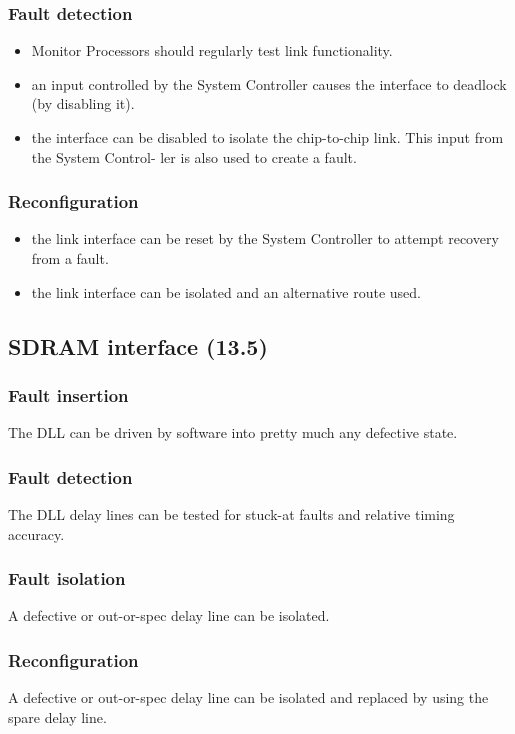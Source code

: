 \documentclass[11pt]{article}
\newenvironment{itmz}{
	\begin{itemize}
		\setlength{\itemsep}{0pt}
		\setlength{\parskip}{0pt}
	}{\end{itemize}}
\begin{document}
\subsubsection*{Fault detection}
\begin{itmz}
\item Monitor Processors should regularly test link functionality.
\item an input controlled by the System Controller causes the interface to deadlock (by disabling it).
\item the interface can be disabled to isolate the chip-to-chip link. This input from the System Control-
ler is also used to create a fault.
\end{itmz}
\subsubsection*{Reconfiguration}
\begin{itmz}
\item the link interface can be reset by the System Controller to attempt recovery from a fault.
\item the link interface can be isolated and an alternative route used.
\end{itmz}

\subsection{SDRAM interface (13.5)}
\subsubsection*{Fault insertion}
The DLL can be driven by software into pretty much any defective state.
\subsubsection*{Fault detection}
The DLL delay lines can be tested for stuck-at faults and relative timing accuracy.
\subsubsection*{Fault isolation}
A defective or out-or-spec delay line can be isolated.
\subsubsection*{Reconfiguration}
A defective or out-or-spec delay line can be isolated and replaced by using the spare delay line.
\end{document}
